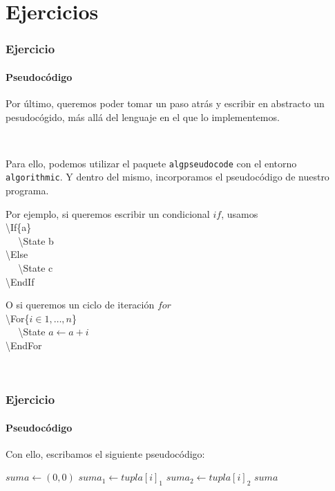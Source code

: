 \section{Ejercicios}\label{ejercicios}

\begin{frame}
\frametitle{Ejercicio}
\framesubtitle{Pseudocódigo}

Por último, queremos poder tomar un paso atrás y escribir en abstracto un pesudocógido, más allá del lenguaje en el que lo implementemos.

\

Para ello, podemos utilizar el paquete \texttt{algpseudocode} con el entorno \texttt{algorithmic}. Y dentro del mismo, incorporamos el pseudocódigo de nuestro programa.

\begin{multicols}{2}

Por ejemplo, si queremos escribir un condicional $if$, usamos \\

\textbackslash If\{a\} \\
$~~~~~~$\textbackslash State b \\
\textbackslash Else \\
$~~~~~~$\textbackslash State c \\
\textbackslash EndIf \\

\pause

O si queremos un ciclo de iteración $for$ \\

\textbackslash For\{$i \in 1,\ldots,n$\} \\
$~~~~~~$\textbackslash State $a \gets a + i$ \\
\textbackslash EndFor

\

\end{multicols}
\end{frame}

\begin{frame}
\frametitle{Ejercicio}
\framesubtitle{Pseudocódigo}

Con ello, escribamos el siguiente pseudocódigo:

\begin{tcolorbox}[colframe=color1]
\begin{center}
\begin{algorithmic}
        \State $suma \gets (0,0)$
            \State $suma_1 \gets tupla[i]_1$
            \State $suma_2 \gets tupla[i]_2$
        \EndFor
        \EndIf
        \State \Return $suma$
    \EndFunction
\end{algorithmic}
\end{center}
\end{tcolorbox}

\end{frame}